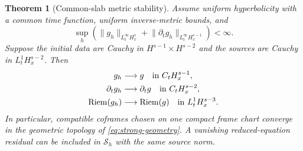 \documentclass[11pt]{article}
\numberwithin{equation}{section}
\newtheorem{theorem}{Theorem}[section]
\theoremstyle{definition}
\theoremstyle{remark}
\newcommand{\Riem}{\operatorname{Riem}}
\newcommand{\norm}[1]{\lVert#1\rVert}
\begin{document}
\begin{theorem}[Common-slab metric stability]
\label{thm:hyperbolic}
Assume uniform hyperbolicity with a common time function, uniform inverse-metric bounds, and
\begin{equation}
 \sup_h\left(\norm{g_h}_{L^\infty_tH^s_x}
       +\norm{\partial_tg_h}_{L^\infty_tH^{s-1}_x}\right)<\infty.
 \label{eq:hyperbolic-bound}
\end{equation}
Suppose the initial data are Cauchy in $H^{s-1}\times H^{s-2}$ and the sources are Cauchy in $L^1_tH^{s-2}_x$. Then
\begin{align}
 g_h&\longrightarrow g\quad\text{in }C_tH^{s-1}_x,\notag\\
 \partial_tg_h&\longrightarrow\partial_tg\quad\text{in }C_tH^{s-2}_x,\notag\\
 \Riem(g_h)&\longrightarrow\Riem(g)
       \quad\text{in }L^1_tH^{s-3}_x.
 \label{eq:hyperbolic-limit}
\end{align}
In particular, compatible coframes chosen on one compact frame chart converge in the geometric topology of \eqref{eq:strong-geometry}. A vanishing reduced-equation residual can be included in $\mathcal S_h$ with the same source norm.
\end{theorem}
\end{document}
